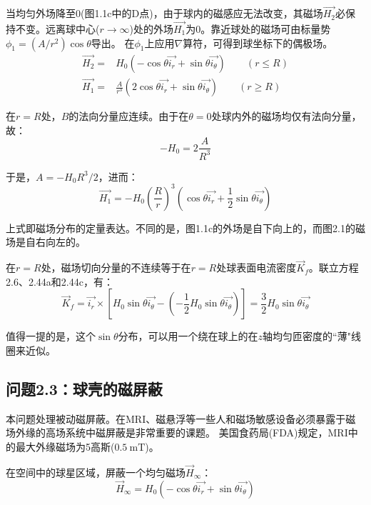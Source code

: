 当均匀外场降至$0$(图1.1c中的D点)，由于球内的磁感应无法改变，其磁场$\vec{H_2}$必保持不变。远离球中心($r\rightarrow \infty$)处的外场$\vec{H_1}$为0。靠近球处的磁场可由标量势$\phi_1=(A/r^2)\cos\theta$导出。
在$\phi_1$上应用$\nabla$算符，可得到球坐标下的偶极场。
\begin{subequations}
	\begin{align}
\vec{H_2}=&H_0 (-\cos\theta \vec{i_r}+\sin\theta \vec{i_\theta})  \qquad(r\le R) \\
\vec{H_1}=&\frac{A}{r^3}(2\cos\theta \vec{i_r}+\sin\theta \vec{i_\theta})\qquad  (r\ge R)
	\end{align}
\end{subequations}

在$r=R$处，$B$的法向分量应连续。由于在$\theta=0$处球内外的磁场均仅有法向分量，故：
$$
-H_0=2\frac{A}{R^3}
$$

于是，$A=-H_0 R^3/2$，进而：
\begin{equation*}
\vec{H_1}=-H_0\left(\frac{R}{r}\right)^3 (\cos\theta \vec{i_r}+\frac{1}{2}\sin\theta \vec{i_\theta}) \tag{2.44c}
\end{equation*}


上式即磁场分布的定量表达。不同的是，图1.1c的外场是自下向上的，而图2.1的磁场是自右向左的。

在$r=R$处，磁场切向分量的不连续等于在$r=R$处球表面电流密度$\vec{K}_f$。联立方程2.6、2.44a和2.44c，有：
\begin{equation}
  \vec{K}_f=\vec{i_r}\times \left[H_0 \sin\theta \vec{i_\theta}-(-\frac{1}{2}H_0 \sin\theta \vec{i_\theta})\right]=\frac{3}{2}H_0\sin\theta\vec{i_\theta}
\end{equation}

值得一提的是，这个$\sin\theta$分布，可以用一个绕在球上的在$z$轴均匀匝密度的``薄"线圈来近似。




\subsection{问题2.3：球壳的磁屏蔽}
本问题处理被动磁屏蔽。在MRI、磁悬浮等一些人和磁场敏感设备必须暴露于磁场外缘的高场系统中磁屏蔽是非常重要的课题。
美国食药局(FDA)规定，MRI中的最大外缘磁场为5高斯($0.5\ \mathrm{mT}$)。

在空间中的球星区域，屏蔽一个均匀磁场$\vec{H}_\infty$：
\begin{equation*}
\vec{H}_\infty=H_0 (-\cos\theta \vec{i_r}+\sin\theta \vec{i_\theta})\tag{2.40}
\end{equation*}

